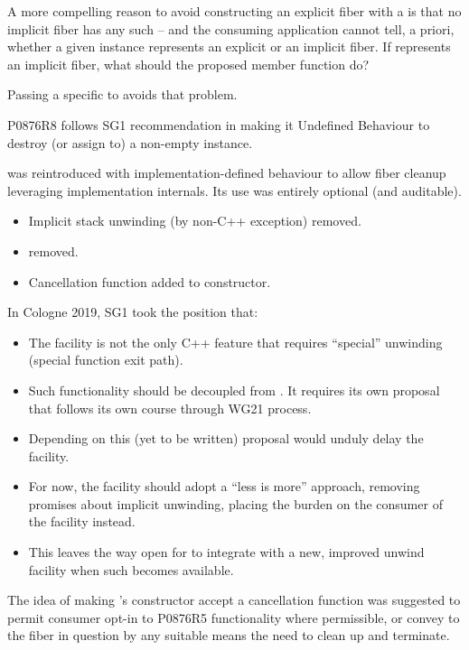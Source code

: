 A more compelling reason to avoid constructing an explicit fiber with
a \cancelfn is that no implicit fiber has any such \cancelfn\xspace -- and the
consuming application cannot tell, a priori, whether a given \fiber instance
represents an explicit or an implicit fiber. If \this represents an
implicit fiber, what should the proposed  member function do?

Passing a specific \cancelfn to \anyresumewith avoids that problem.

P0876R8 follows SG1 recommendation in making it Undefined Behaviour to destroy
(or assign to) a non-empty \fiber instance.

\unwindfib was reintroduced with implementation-defined behaviour to allow fiber
cleanup leveraging implementation internals. Its use was entirely optional (and
auditable). 


\begin{itemize}
    \item Implicit stack unwinding (by non-C++ exception) removed.
    \item \unwindfib removed.
    \item Cancellation function added to \fiber constructor.
\end{itemize}

In Cologne 2019, SG1 took the position that:

\begin{itemize}
    \item The \fiber facility is not the only C++ feature that
          requires ``special'' unwinding (special function exit path).
    \item Such functionality should be decoupled from \fiber. It requires its
          own proposal that follows its own course through WG21 process.
    \item Depending on this (yet to be written) proposal would unduly delay
          the \fiber facility.
    \item For now, the \fiber facility should adopt a ``less is
          more'' approach, removing promises about implicit unwinding, placing
          the burden on the consumer of the facility instead.
    \item This leaves the way open for \fiber to integrate with
          a new, improved unwind facility when such becomes available.
\end{itemize}

The idea of making \fiber's constructor accept a cancellation function was
suggested to permit consumer opt-in to P0876R5 functionality where
permissible, or convey to the fiber in question by any suitable means the need
to clean up and terminate.

